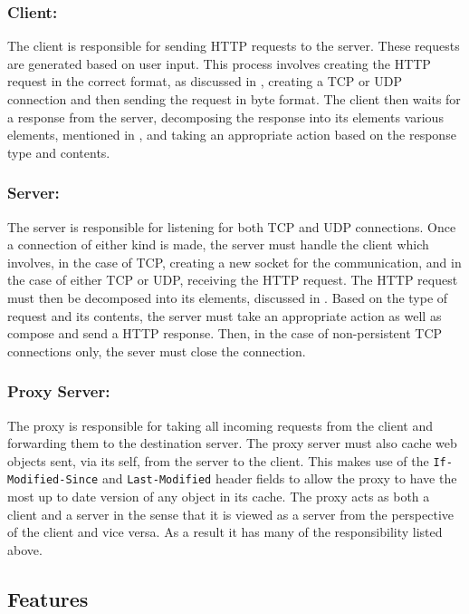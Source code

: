 \documentclass[10pt,twocolumn]{witseiepaper}
\begin{document}
	\subsubsection{Client:}

	The client is responsible for sending HTTP requests to the server. These requests are generated based on user input. This process involves creating the HTTP request in the correct format, as discussed in , creating a TCP or UDP connection and then sending the request in byte format. The client then waits for a response from the server, decomposing the response into its elements various elements, mentioned in , and taking an appropriate action based on the response type and contents.

	\subsubsection{Server:}

	The server is responsible for listening for both TCP and UDP connections. Once a connection of either kind is made, the server must handle the client which involves, in the case of TCP, creating a new socket for the communication, and in the case of either TCP or UDP, receiving the HTTP request. The HTTP request must then be decomposed into its elements, discussed in . Based on the type of request and its contents, the server must take an appropriate action as well as compose and send a HTTP response. Then, in the case of non-persistent TCP connections only, the sever must close the connection.

	\subsubsection{Proxy Server:}

	The proxy is responsible for taking all incoming requests from the client and forwarding them to the destination server. The proxy server must also cache web objects sent, via its self, from the server to the client. This makes use of the \verb|If-Modified-Since| and \verb|Last-Modified| header fields to allow the proxy to have the most up to date version of any object in its cache. The proxy acts as both a client and a server in the sense that it is viewed as a server from the perspective of the client and vice versa. As a result it has many of the responsibility listed above.

\subsection{Features}
\end{document}
